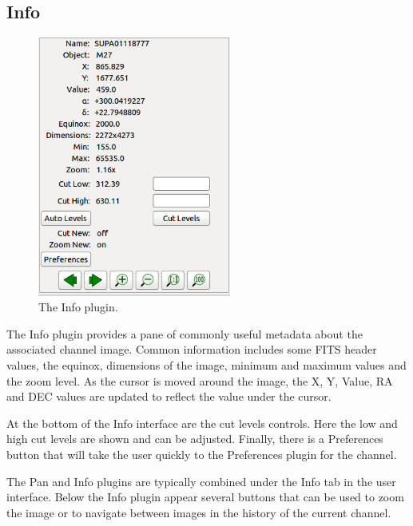 \documentclass[11pt]{report}
\begin{document}
\subsection{Info}
\begin{figure}
  \includegraphics[width=2.5in]{info-plugin.png}
  \caption[example] 
          { \label{fig:info-plugin} 
            The Info plugin.} 
\end{figure} 
The Info plugin provides a pane of commonly useful metadata about the
associated channel image.  Common information includes some
FITS header values, the equinox, dimensions of the image, minimum and
maximum values and the zoom level.  As the cursor is moved around the
image, the X, Y, Value, RA and DEC values are updated to reflect the
value under the cursor.

At the bottom of the Info interface are the cut levels controls. Here
the low and high cut levels are shown and can be adjusted.  Finally,
there is a Preferences button that will take the user quickly to the
Preferences plugin for the channel.

The Pan and Info plugins are typically combined under the Info tab in
the user interface.  Below the Info plugin appear several buttons that
can be used to zoom the image or to navigate between images in the
history of the current channel.

\newpage
\end{document}
